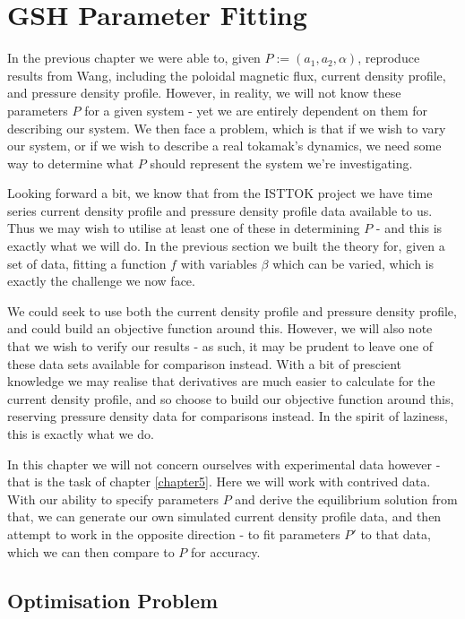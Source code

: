 \section{GSH Parameter Fitting}

In the previous chapter we were able to, given $P := (a_1, a_2, \alpha)$, reproduce results from Wang, including 
the poloidal magnetic flux, current density profile, and pressure density profile. However, in reality, we will 
not know these parameters $P$ for a given system - yet we are entirely dependent on them for describing our system. 
We then face a problem, which is that if we wish to vary our system, or if we wish to describe a real tokamak's dynamics,
we need some way to determine what $P$ should represent the system we're investigating. 

Looking forward a bit, we know that from the ISTTOK project we have time series current density profile and pressure density profile data 
available to us. Thus we may wish to utilise at least one of these in determining $P$ - and this is exactly what we will do. 
In the previous section we built the theory for, given a set of data, fitting a function $f$ with variables $\beta$ which can be varied, 
which is exactly the challenge we now face. 

We could seek to use both the current density profile and pressure density profile, and could build an objective function around this. However, 
we will also note that we wish to verify our results - as such, it may be prudent to leave one of these data sets available for comparison instead. 
With a bit of prescient knowledge we may realise that derivatives are much easier to calculate for the current density profile, and so choose 
to build our objective function around this, reserving pressure density data for comparisons instead. In the spirit of laziness, this is 
exactly what we do.

In this chapter we will not concern ourselves with experimental data however - that is the task of chapter \ref{chapter5}. Here we 
will work with contrived data. With our ability to specify parameters $P$ and derive the equilibrium solution from that, we can generate 
our own simulated current density profile data, and then attempt to work in the opposite direction - to fit parameters $P'$ to that data, 
which we can then compare to $P$ for accuracy.

\subsection{Optimisation Problem}


